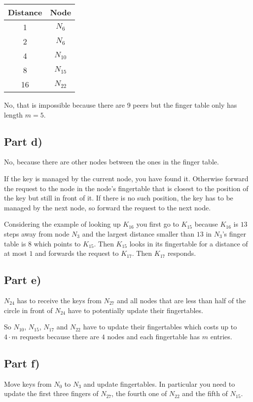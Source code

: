 \documentclass[10pt,a4paper]{article}
\begin{document}
\begin{tabular}{c|c}
  Distance & Node\\
  \hline
  1 & $N_{6}$\\
  2 & $N_{6}$\\
  4 & $N_{10}$\\
  8 & $N_{15}$\\
  16 & $N_{22}$
\end{tabular}

No, that is impossible because there are 9 peers but the finger table only has length $m = 5$.

\subsection*{Part d)}

No, because there are other nodes between the ones in the finger table.

If the key is managed by the current node, you have found it.
Otherwise forward the request to the node in the node's fingertable that is closest to the position of the key but still in front of it.
If there is no such position, the key has to be managed by the next node, so forward the request to the next node.

Considering the example of looking up $K_{16}$ you first go to $K_{15}$ because $K_{16}$ is $13$ steps away from node $N_{3}$ and the largest distance smaller than $13$ in $N_{3}$'s finger table is $8$ which points to $K_{15}$.
Then $K_{15}$ looks in its fingertable for a distance of at most $1$ and forwards the request to $K_{17}$.
Then $K_{17}$ responds.

\subsection*{Part e)}

$N_{24}$ has to receive the keys from $N_{27}$ and all nodes that are less than half of the circle in front of $N_{24}$ have to potentially update their fingertables.

So $N_{10}$, $N_{15}$, $N_{17}$ and $N_{22}$ have to update their fingertables which costs up to $4 \cdot m$ requests because there are $4$ nodes and each fingertable has $m$ entries.

\subsection*{Part f)}

Move keys from $N_{0}$ to $N_{3}$ and update fingertables.
In particular you need to update the first three fingers of $N_{27}$, the fourth one of $N_{22}$ and the fifth of $N_{15}$.
\end{document}
